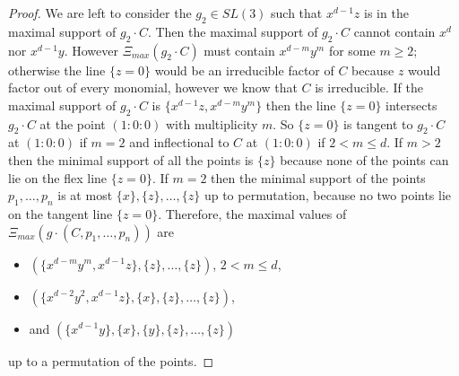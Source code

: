 \documentclass{amsart}
\numberwithin{equation}{section}
\theoremstyle{definition}
\begin{document}
\begin{proof}
      
   We are left to consider the $g_2 \in SL(3)$ such that $x^{d-1}z$ is in the maximal support of $g_2 \cdot C$. Then the maximal support of $g_2 \cdot C$ cannot contain $x^d$ nor $x^{d-1}y$. However $\Xi_{max}(g_2 \cdot C)$ must contain $x^{d-m}y^m$ for some $m \geq 2$; otherwise the line $\{z=0\}$ would be an irreducible factor of $C$ because $z$ would factor out of every monomial, however we know that $C$ is irreducible. If the maximal support of $g_2 \cdot C$ is $\{ x^{d-1}z, x^{d-m}y^m \}$ then the line $\{z=0\}$  intersects $g_2 \cdot C$ at the point $(1:0:0)$ with multiplicity $m$. So $\{z=0\}$ is tangent to $g_2 \cdot C$ at $(1:0:0)$ if $m=2$ and inflectional to $C$ at $(1:0:0)$ if $2< m \leq d$. 
   If $m>2$ then the minimal support of all the points is $\{z\}$ because none of the points can lie on the flex line $\{z=0\}$. If $m=2$ then the minimal support of the points $p_1, \dots , p_n$ is at most $\{x\}, \{z\}, \dots , \{z\}$ up to permutation, because no two points lie on the tangent line $\{z=0\}$. Therefore, the maximal values of $\Xi_{max}(g \cdot (C, p_1 , \dots , p_n))$ are
   \begin{itemize}
       \item $(\{x^{d-m}y^m, x^{d-1}z\}, \{z\}, \dots , \{z\})$, $2 < m \leq d$, 
       \item $(\{x^{d-2}y^2, x^{d-1}z\}, \{x\}, \{z\}, \dots , \{z\})$,
       \item and $(\{x^{d-1}y\}, \{x\}, \{y\}, \{z\}, \dots , \{z\})$
   \end{itemize}
   up to a permutation of the points.



\end{proof}
\end{document}

